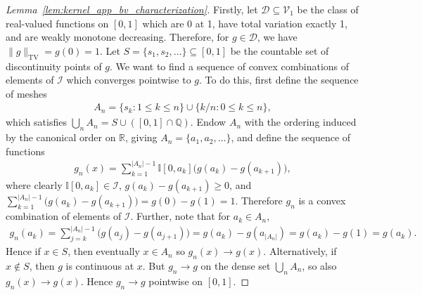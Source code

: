 \documentclass[11pt,lof]{puthesis}
\newcommand{\R}{\ensuremath{\mathbb{R}}}
\newcommand{\Q}{\ensuremath{\mathbb{Q}}}
\newcommand{\I}{\ensuremath{\mathbb{I}}}
\newcommand{\TV}{\mathrm{TV}}
\newcommand{\cV}{\ensuremath{\mathcal{V}}}
\newcommand{\cD}{\ensuremath{\mathcal{D}}}
\newcommand{\cI}{\ensuremath{\mathcal{I}}}
\theoremstyle{break}
\theoremstyle{proof}
\newtheorem{proof}{Proof}
\begin{document}
\begin{proof}[Lemma~\ref{lem:kernel_app_bv_characterization}]

  Firstly, let $\cD \subseteq \cV_1$
  be the class of real-valued functions
  on $[0,1]$
  which are
  0 at 1,
  have total variation exactly 1,
  and are weakly monotone decreasing.
  Therefore, for $g \in \cD$, we have
  $\|g\|_\TV = g(0) = 1$.
  Let $S = \{s_1, s_2, \dots\} \subseteq [0,1]$
  be the countable set of discontinuity points of $g$.
  We want to find a sequence of
  convex combinations of elements of
  $\cI$ which converges pointwise to $g$.
  To do this, first define the sequence of meshes
  \begin{align*}
    A_n =
    \{s_k : 1 \leq k \leq n\}
    \cup
    \{k/n : 0 \leq k \leq n\},
  \end{align*}
  which satisfies
  $\bigcup_n A_n = S \cup ([0,1] \cap \Q)$.
  Endow $A_n$ with the ordering
  induced by the canonical order on $\R$,
  giving $A_n = \{a_1, a_2, \ldots\}$,
  and define the sequence of functions
  \begin{align*}
    g_n(x)
    = \sum_{k = 1}^{|A_n|-1}
    \I[0,a_k]
    \big( g(a_k) - g(a_{k+1}) \big),
  \end{align*}
  where clearly
  $\I[0, a_k] \in \cI$,
  $g(a_k) - g(a_{k+1}) \geq 0$,
  and $\sum_{k = 1}^{|A_n|-1}
  \big(
    g(a_k) - g(a_{k+1})
  \big)
  = g(0) - g(1) = 1$.
  Therefore $g_n$ is a convex combination of elements of $\cI$.
  Further, note that for
  $a_k \in A_n$,
  \begin{align*}
    g_n(a_k)
    = \sum_{j = k}^{|A_n|-1}
    \big( g(a_j) - g(a_{j+1}) \big)
    = g(a_k) - g(a_{|A_n|})
    = g(a_k) - g(1)
    = g(a_k).
  \end{align*}
  Hence if $x \in S$, then eventually $x \in A_n$ so $g_n(x) \to g(x)$.
  Alternatively, if $x \not\in S$, then $g$ is continuous at $x$.
  But $g_n \to g$ on the dense set $\bigcup_n A_n$,
  so also $g_n(x) \to g(x)$.
  Hence $g_n \to g$
  pointwise on $[0,1]$.


\end{proof}
\end{document}
